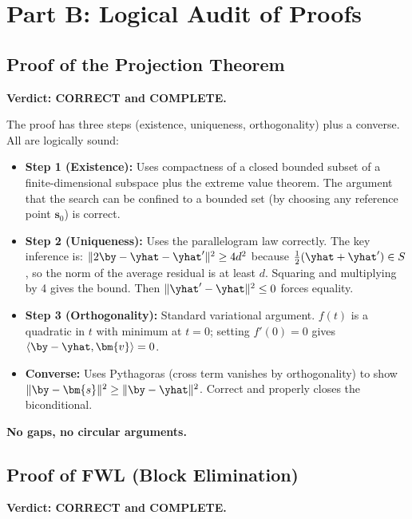 \section*{Part B: Logical Audit of Proofs}


\subsection*{Proof of the Projection Theorem}

\textbf{Verdict: CORRECT and COMPLETE.}

The proof has three steps (existence, uniqueness, orthogonality) plus a
converse.  All are logically sound:

\begin{itemize}[nosep]
  \item \textbf{Step 1 (Existence):}  Uses compactness of a closed bounded
        subset of a finite-dimensional subspace plus the extreme value
        theorem.  The argument that the search can be confined to a bounded
        set (by choosing any reference point $\bm{s}_0$) is correct. \checkmark
  \item \textbf{Step 2 (Uniqueness):}  Uses the parallelogram law correctly.
        The key inference is: $\|2\by - \yhat - \yhat'\|^2 \ge 4d^2$ because
        $\tfrac{1}{2}(\yhat+\yhat') \in S$, so the norm of the average
        residual is at least $d$.  Squaring and multiplying by 4 gives the
        bound. Then $\|\yhat'-\yhat\|^2 \le 0$ forces equality. \checkmark
  \item \textbf{Step 3 (Orthogonality):}  Standard variational argument.
        $f(t)$ is a quadratic in $t$ with minimum at $t=0$; setting $f'(0)=0$
        gives $\langle \by-\yhat, \bm{v}\rangle = 0$. \checkmark
  \item \textbf{Converse:}  Uses Pythagoras (cross term vanishes by
        orthogonality) to show $\|\by-\bm{s}\|^2 \ge \|\by-\yhat\|^2$.
        Correct and properly closes the biconditional. \checkmark
\end{itemize}

\textbf{No gaps, no circular arguments.}


\subsection*{Proof of FWL (Block Elimination)}

\textbf{Verdict: CORRECT and COMPLETE.}

